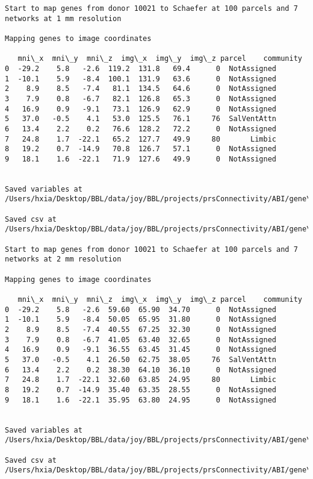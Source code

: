 \documentclass[11pt]{article}
\begin{document}
    \begin{Verbatim}[commandchars=\\\{\}]
Start to map genes from donor 10021 to Schaefer at 100 parcels and 7 networks at 1 mm resolution

Mapping genes to image coordinates

   mni\_x  mni\_y  mni\_z  img\_x  img\_y  img\_z parcel    community
0  -29.2    5.8   -2.6  119.2  131.8   69.4      0  NotAssigned
1  -10.1    5.9   -8.4  100.1  131.9   63.6      0  NotAssigned
2    8.9    8.5   -7.4   81.1  134.5   64.6      0  NotAssigned
3    7.9    0.8   -6.7   82.1  126.8   65.3      0  NotAssigned
4   16.9    0.9   -9.1   73.1  126.9   62.9      0  NotAssigned
5   37.0   -0.5    4.1   53.0  125.5   76.1     76  SalVentAttn
6   13.4    2.2    0.2   76.6  128.2   72.2      0  NotAssigned
7   24.8    1.7  -22.1   65.2  127.7   49.9     80       Limbic
8   19.2    0.7  -14.9   70.8  126.7   57.1      0  NotAssigned
9   18.1    1.6  -22.1   71.9  127.6   49.9      0  NotAssigned


Saved variables at /Users/hxia/Desktop/BBL/data/joy/BBL/projects/prsConnectivity/ABI/gene\_mapping/10021donor\_100Parcels\_7Network\_1mm.pkl

Saved csv at /Users/hxia/Desktop/BBL/data/joy/BBL/projects/prsConnectivity/ABI/gene\_mapping/10021donor\_100Parcels\_7Network\_1mm.csv

Start to map genes from donor 10021 to Schaefer at 100 parcels and 7 networks at 2 mm resolution

Mapping genes to image coordinates

   mni\_x  mni\_y  mni\_z  img\_x  img\_y  img\_z parcel    community
0  -29.2    5.8   -2.6  59.60  65.90  34.70      0  NotAssigned
1  -10.1    5.9   -8.4  50.05  65.95  31.80      0  NotAssigned
2    8.9    8.5   -7.4  40.55  67.25  32.30      0  NotAssigned
3    7.9    0.8   -6.7  41.05  63.40  32.65      0  NotAssigned
4   16.9    0.9   -9.1  36.55  63.45  31.45      0  NotAssigned
5   37.0   -0.5    4.1  26.50  62.75  38.05     76  SalVentAttn
6   13.4    2.2    0.2  38.30  64.10  36.10      0  NotAssigned
7   24.8    1.7  -22.1  32.60  63.85  24.95     80       Limbic
8   19.2    0.7  -14.9  35.40  63.35  28.55      0  NotAssigned
9   18.1    1.6  -22.1  35.95  63.80  24.95      0  NotAssigned


Saved variables at /Users/hxia/Desktop/BBL/data/joy/BBL/projects/prsConnectivity/ABI/gene\_mapping/10021donor\_100Parcels\_7Network\_2mm.pkl

Saved csv at /Users/hxia/Desktop/BBL/data/joy/BBL/projects/prsConnectivity/ABI/gene\_mapping/10021donor\_100Parcels\_7Network\_2mm.csv


\end{Verbatim}
\end{document}

